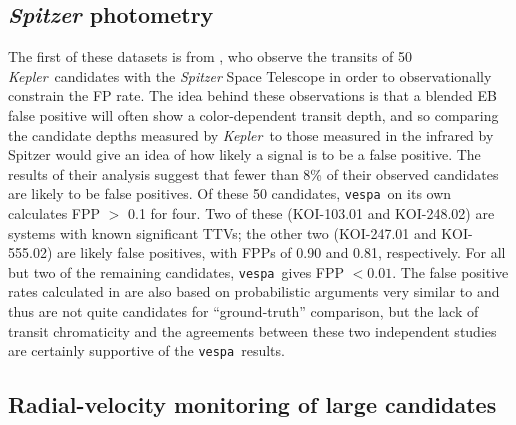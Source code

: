 \documentclass{emulateapj}
\newcommand{\kepler}{\textit{Kepler}}
\newcommand{\vespa}{\texttt{vespa}}
\begin{document}
\subsection{\textit{Spitzer} photometry}
 
The first of these datasets is from \citet{Desert:2015}, who observe
the transits of 50 \kepler\ candidates with the \textit{Spitzer} Space
Telescope in order to observationally constrain the FP rate.  The idea
behind these observations is that a blended EB false positive will
often show a color-dependent transit depth, and so comparing the
candidate depths measured by \kepler\ to those measured in the
infrared by Spitzer would give an idea of how likely a signal is to be
a false positive. The results of their analysis suggest that fewer
than 8\% of their observed candidates are likely to be false
positives.  Of these 50 candidates, \vespa\ on its own calculates FPP
$>$ 0.1 for four.  Two of these (KOI-103.01 and KOI-248.02) are
systems with known significant TTVs; the other two (KOI-247.01 and
KOI-555.02) are likely false positives, with FPPs of 0.90 and 0.81,
respectively.  For all but two of the remaining candidates, \vespa\
gives FPP $< 0.01$.  The false positive rates calculated in
\citet{Desert:2015} are also based on probabilistic arguments very
similar to \citet{Morton:2011b} and thus are not quite candidates for
``ground-truth'' comparison, but the lack of transit chromaticity and
the agreements between these two independent studies are certainly
supportive of the \vespa\ results.

\subsection{Radial-velocity monitoring of large candidates}
\end{document}
